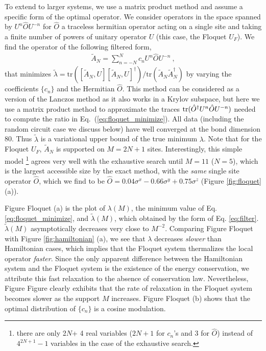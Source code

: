 \documentclass[twocolumn,superscriptaddress, prb]{revtex4-1}
\begin{document}
To extend to larger systems, we use a matrix product method and assume a specific form of the optimal operator.
We consider operators in the space spanned by $U^n \hat{O} U^{- n}$ for $\hat{O}$ a traceless hermitian operator acting on a single site
and taking a finite number of powers of unitary operator $U$ (this case, the Floquet $U_F$).
We find the operator of the following filtered form,
\begin{align}
 \tilde{A}_N=\sum_{n=-N}^N c_n U^n \hat{O} U^{- n} ~,
 \label{eq:filter}
\end{align}
that minimizes $\tilde{\lambda} = \mathrm{tr}([\tilde{A}_N,U][\tilde{A}_N,U]^\dag)/\mathrm{tr}(\tilde{A}_N\tilde{A}_N^\dag)$
by varying the coefficients $\{c_n\}$ and the Hermitian $\hat{O}$.
This method can be considered as a version of the Lanczos method as it also works in a Krylov subspace,
but here we use a matrix product method to approximate the traces ${\rm tr}(\hat{O}^\dagger U^n \hat{O} U^{-n})$ needed to compute the ratio in Eq.~(\ref{eq:floquet_minimize}). All data (including the random circuit case we discuss below) have well converged at the bond dimension 80. 
Thus $\tilde{\lambda}$ is a variational upper bound of the true minimum $\lambda$.
Note that for the Floquet $U_F$, $\tilde{A}_N$ is supported on $M = 2N+1$ sites.
Interestingly, this simple model \footnote{there are only 2$N$+ 4 real variables ($2N+1$ for $c_n$'s and 3 for $\hat{O}$) instead of $4^{2N+1} - 1$ variables
in the case of the exhaustive search.}
agrees very well with the exhaustive search until $M = 11$ ($N = 5$), which is the largest accessible size by the exact method,
with the {\it same} single site operator $\hat{O}$, 
which we find to be $\hat{O} = 0.04\sigma^x  - 0.66\sigma^y + 0.75\sigma^z$ 
(Figure \ref{fig:floquet} (a)). 


Figure Floquet (a) is the plot of $\lambda (M)$, the minimum value of Eq. \ref{eq:floquet_minimize}, and
$\tilde{\lambda}(M)$, which obtained by the form of Eq. \eqref{eq:filter}.
$\tilde{\lambda}(M)$ asymptotically decreases very close to $M^{-2}$.
Comparing Figure Floquet with Figure \ref{fig:hamiltonian} (a),
we see that $\lambda$ decreases {\it slower} than Hamiltonian cases, which implies that the Floquet system thermalizes
the local operator {\it faster}. Since the only apparent difference between the Hamiltonian system and the Floquet system
is the existence of the energy conservation, we attribute this fast relaxation to the absence of conservation law.
Nevertheless, Figure Figure clearly exhibits that the rate of relaxation in the Floquet system
becomes slower as the support $M$ increases.
Figure Floquet (b) shows that the optimal distribution of $\{ c_n\}$ is a cosine modulation.
\end{document}

